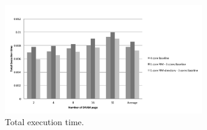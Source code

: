 \begin{figure}[h]
  \centering
  \includegraphics[height = 2.5 in, width=3.4in]{figures/figure10.pdf}
  \caption{Total execution time.}
  \label{fig:profile}
\end{figure}
